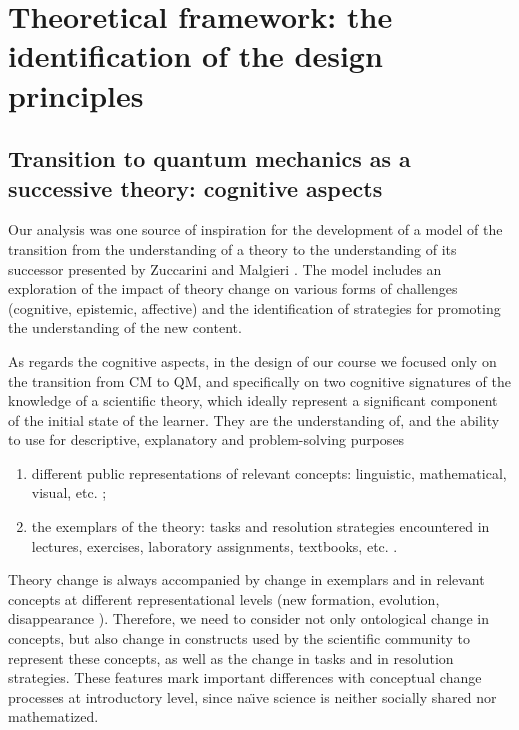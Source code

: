\documentclass[twocolumn,secnumarabic,amssymb, nobibnotes, aps, prd, nofootinbib]{revtex4-2}
\begin{document}
\section{Theoretical framework: the identification of the design principles} \label{Sec:2}

\subsection{Transition to quantum mechanics as a successive theory: cognitive aspects}
Our analysis was one source of inspiration for the development of a model of the transition from the understanding of a theory to the understanding of its successor presented by Zuccarini and Malgieri \cite{Zuccarini2022}. The model includes an exploration of the impact of theory change on various forms of challenges (cognitive, epistemic, affective) and the identification of strategies for promoting the understanding of the new content.

As regards the cognitive aspects, in the design of our course we focused only on the transition from CM to QM, and specifically on two cognitive signatures of the knowledge of a scientific theory, which ideally represent a significant component of the initial state of the learner. They are the understanding of, and the ability to use for descriptive, explanatory and problem-solving purposes
\begin{enumerate}[1.]
\item different public representations of relevant concepts: linguistic, mathematical, visual, etc. \cite{Arabatzis2020};
\item the exemplars of the theory: tasks and resolution strategies encountered in lectures, exercises, laboratory assignments, textbooks, etc. \cite[p. 134]{Hoyningen1993}.
\end{enumerate}
Theory change is always accompanied by change in exemplars and in relevant concepts at different representational levels (new formation, evolution, disappearance \cite{Arabatzis2020}). Therefore, we need to consider not only ontological change in concepts, but also change in constructs used by the scientific community to represent these concepts, as well as the change in tasks and in resolution strategies. These features mark important differences with conceptual change processes at introductory level, since na\"{\i}ve science is neither socially shared nor mathematized.
\end{document}
